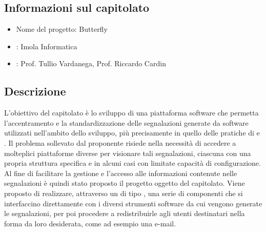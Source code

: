 \subsection{Informazioni sul capitolato}
    \begin{itemize}
        \item Nome del progetto: Butterfly
        \item \textbf{}: Imola Informatica
        \item \textbf{}: Prof. Tullio Vardanega, Prof. Riccardo Cardin
    \end{itemize}
\subsection{Descrizione}
L'obiettivo del capitolato è lo sviluppo di una piattaforma software che permetta l'accentramento e la standardizzazione delle segnalazioni generate da software utilizzati nell'ambito dello sviluppo, più precisamente in quello delle pratiche di  e . Il problema sollevato dal proponente risiede nella necessità di accedere a molteplici piattaforme diverse per visionare tali segnalazioni, ciascuna con una propria struttura specifica e in alcuni casi con limitate capacità di configurazione. Al fine di facilitare la gestione e l'accesso alle informazioni contenute nelle segnalazioni è quindi stato proposto il progetto oggetto del capitolato. Viene proposto di realizzare, attraverso un  di tipo , una serie di componenti che si interfaccino direttamente con i diversi strumenti software da cui vengono generate le segnalazioni, per poi procedere a redistribuirle agli utenti destinatari nella forma da loro desiderata, come ad esempio una e-mail.
